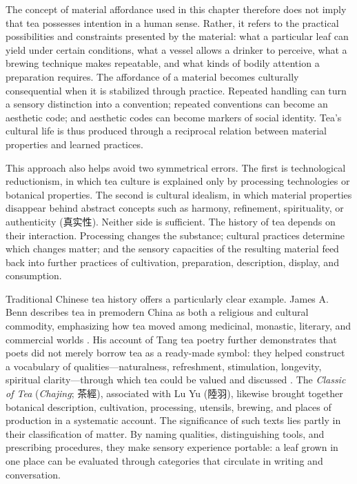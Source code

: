 \documentclass[numbers]{IntechOpen-Book}
\newcommand{\zh}[1]{{\CJKfontspec{Noto Serif CJK SC}\upshape #1}}
\begin{document}
The concept of material affordance used in this chapter therefore does not imply that tea possesses intention in a human sense. Rather, it refers to the practical possibilities and constraints presented by the material: what a particular leaf can yield under certain conditions, what a vessel allows a drinker to perceive, what a brewing technique makes repeatable, and what kinds of bodily attention a preparation requires. The affordance of a material becomes culturally consequential when it is stabilized through practice. Repeated handling can turn a sensory distinction into a convention; repeated conventions can become an aesthetic code; and aesthetic codes can become markers of social identity. Tea's cultural life is thus produced through a reciprocal relation between material properties and learned practices.

This approach also helps avoid two symmetrical errors. The first is technological reductionism, in which tea culture is explained only by processing technologies or botanical properties. The second is cultural idealism, in which material properties disappear behind abstract concepts such as harmony, refinement, spirituality, or authenticity (\zh{真实性}). Neither side is sufficient. The history of tea depends on their interaction. Processing changes the substance; cultural practices determine which changes matter; and the sensory capacities of the resulting material feed back into further practices of cultivation, preparation, description, display, and consumption.

Traditional Chinese tea history offers a particularly clear example. James A. Benn describes tea in premodern China as both a religious and cultural commodity, emphasizing how tea moved among medicinal, monastic, literary, and commercial worlds \cite{benn}. His account of Tang tea poetry further demonstrates that poets did not merely borrow tea as a ready-made symbol: they helped construct a vocabulary of qualities---naturalness, refreshment, stimulation, longevity, spiritual clarity---through which tea could be valued and discussed \cite{bennpoetry}. The \textit{Classic of Tea} (\textit{Chajing}; \zh{茶經}), associated with Lu Yu (\zh{陸羽}), likewise brought together botanical description, cultivation, processing, utensils, brewing, and places of production in a systematic account. The significance of such texts lies partly in their classification of matter. By naming qualities, distinguishing tools, and prescribing procedures, they make sensory experience portable: a leaf grown in one place can be evaluated through categories that circulate in writing and conversation.
\end{document}
